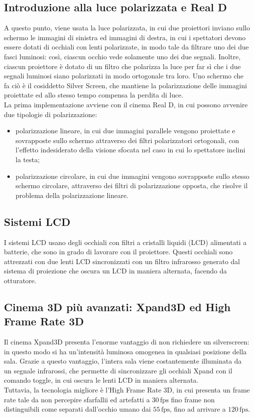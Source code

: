 \subsection{Introduzione alla luce polarizzata e Real D}
A questo punto, viene usata la luce polarizzata, in cui due proiettori inviano sullo schermo le immagini di sinistra ed immagini di destra, in cui i 
spettatori devono essere dotati di occhiali con lenti polarizzate, in modo tale da filtrare uno dei due fasci luminosi: così, ciascun occhio vede 
solamente uno dei due segnali. Inoltre, ciascun proiettore è dotato di un filtro che polarizza la luce per far sì che i due segnali luminosi siano
polarizzati in modo ortogonale tra loro. Uno schermo che fa ciò è il cosiddetto Silver Screen, che mantiene la polarizzazione delle immagini proiettate
ed allo stesso tempo compensa la perdita di luce.\\
La prima implementazione avviene con il cinema Real D, in cui possono avvenire due tipologie di polarizzazione:
\begin{itemize}
    \item polarizzazione lineare, in cui due immagini parallele vengono proiettate e sovrapposte sullo schermo attraverso dei filtri polarizzatori
            ortogonali, con l'effetto indesiderato della visione sfocata nel caso in cui lo spettatore inclini la testa;
    \item polarizzazione circolare, in cui due immagini vengono sovrapposte sullo stesso schermo circolare, attraverso dei filtri di polarizzazione
            opposta, che risolve il problema della polarizzazione lineare.
\end{itemize}
\subsection{Sistemi LCD}
I sistemi LCD usano degli occhiali con filtri a cristalli liquidi (LCD) alimentati a batterie, che sono in grado di lavorare con il proiettore. Questi
occhiali sono attrezzati con due lenti LCD sincronizzati con un filtro infrarosso generato dal sistema di proiezione che oscura un LCD in maniera
alternata, facendo da otturatore.
\subsection{Cinema 3D più avanzati: Xpand3D ed High Frame Rate 3D}
Il cinema Xpand3D presenta l'enorme vantaggio di non richiedere un silverscreen: in questo modo si ha un'intensità luminosa omogenea in qualsiasi posizione
della sala. Grazie a questo vantaggio, l'intera sala viene costantemente illuminata da un segnale infrarossi, che permette di sincronizzare gli occhiali
Xpand con il comando toggle, in cui oscura le lenti LCD in maniera alternata.\\
Tuttavia, la tecnologia migliore è l'High Frame Rate 3D, in cui presenta un frame rate tale da non percepire sfarfallii ed artefatti a
$30 \, \text{fps}$ fino frame non distinguibili come separati dall'occhio umano dai $55 \, \text{fps}$, fino ad arrivare a $120 \, \text{fps}$.
